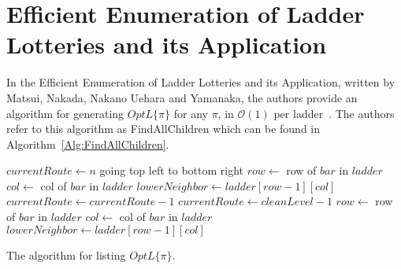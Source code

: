 \section{Efficient Enumeration of Ladder Lotteries and its Application}

In the Efficient Enumeration of Ladder Lotteries and its Application, written by Matsui, Nakada, Nakano Uehara and Yamanaka,
the authors provide an algorithm for generating $OptL\{\pi\}$ 
for any $\pi$, in $\mathcal{O}(1)$ per ladder~\cite{A1}. The authors refer to this algorithm as {\sc FindAllChildren}
which can be found in Algorithm~\ref{Alg:FindAllChildren}. 
\begin{algorithm}[!htp]
	\begin{algorithmic}[1]
			\State $currentRoute \gets n$
				\State going top left to bottom right 
					\State $row \gets$ row of $bar$ in $ladder$ 
					\State $col \gets$ col of $bar$ in $ladder$
					\State $lowerNeighbor \gets ladder[row-1][col]$
					\EndIf
				\EndFor
				\State $currentRoute \gets currentRoute-1$
			\EndWhile
			\State $currentRoute \gets cleanLevel-1$
				\State $row \gets$ row of $bar$ in $ladder$ 
				\State $col \gets$ col of $bar$ in $ladder$
				\State $lowerNeighbor \gets ladder[row-1][col]$
				\EndIf
			\EndFor
		\EndFunction
	\end{algorithmic}
	\caption{The algorithm for listing $OptL\{\pi\}$.}
	\label{Alg:FindAllChildren}
\end{algorithm}
\pagebreak

